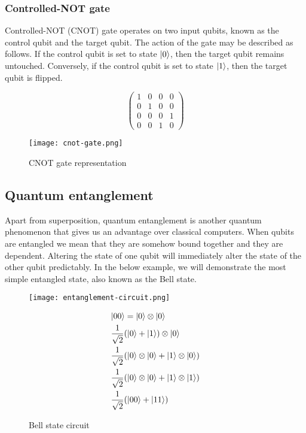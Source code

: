 \subsubsection*{Controlled-NOT gate} 
Controlled-NOT (CNOT) gate operates on two input qubits, known as the control qubit and the target qubit. The action of the gate may be described as follows. If the control qubit is set to state $\lvert0\rangle$, then the target qubit remains untouched. Conversely, if the control qubit is set to state $\lvert1\rangle$, then the target qubit is flipped.

\begin{figure}[H]
  \centering
  \begin{minipage}[c]{0.4\linewidth}
    \centering
    $$\begin{pmatrix}
      1 & 0 & 0 & 0 \\
      0 & 1 & 0 & 0 \\
      0 & 0 & 0 & 1 \\
      0 & 0 & 1 & 0
  \end{pmatrix}$$
  \end{minipage}
  \begin{minipage}[c]{0.25\linewidth}
    \centering
    \texttt{[image: cnot-gate.png]}
  \end{minipage}
  \caption{CNOT gate representation}
\end{figure}

\subsection*{Quantum entanglement}
Apart from superposition, quantum entanglement is another quantum phenomenon that gives us an advantage over classical computers. When qubits are entangled we mean that they are somehow bound together and they are dependent. Altering the state of one qubit will immediately alter the state of the other qubit predictably. In the below example, we will demonstrate the most simple entangled state, also known as the Bell state.

\begin{figure}[H]
\begin{minipage}{.5\textwidth}
    \centering
    \texttt{[image: entanglement-circuit.png]}
    \caption{Bell state circuit}
\end{minipage}
\begin{minipage}{.5\textwidth}
  \begin{align} 
             &\lvert00\rangle = \lvert0\rangle \otimes \lvert0\rangle \label{eq1} \\
             &\frac{1}{\sqrt{2}}(\lvert0\rangle + \lvert1\rangle) \otimes \lvert0\rangle \label{eq2}\\
             &\frac{1}{\sqrt{2}}(\lvert0\rangle \otimes \lvert0\rangle + \lvert1\rangle \otimes \lvert0\rangle) \label{eq3} \\
             &\frac{1}{\sqrt{2}}(\lvert0\rangle \otimes \lvert0\rangle + \lvert1\rangle \otimes \lvert1\rangle) \label{eq4}\\
             &\frac{1}{\sqrt{2}}(\lvert00\rangle + \lvert11\rangle) \label{eq5}
  \end{align}
\end{minipage}
\end{figure}

